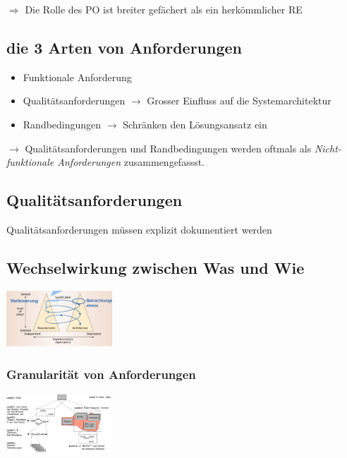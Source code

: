 \documentclass{report}
\newenvironment{Figure}
	{\par\medskip\noindent\minipage{\linewidth}}
	{\endminipage\par\medskip}
\theoremstyle{definition}
\theoremstyle{example}
\begin{document}
$\Rightarrow$ Die Rolle des PO ist breiter gefächert als ein herkömmlicher RE

\subsection{die 3 Arten von Anforderungen}
\begin{itemize}
   \item Funktionale Anforderung
   \item Qualitätsanforderungen $\rightarrow$ Grosser Einfluss auf die Systemarchitektur
   \item Randbedingungen $\rightarrow$ Schränken den Lösungsansatz ein
\end{itemize}
$\rightarrow$ Qualitätsanforderungen und Randbedingungen werden oftmals als \textit{Nicht-funktionale Anforderungen} zusammengefassst.

   \subsection{Qualitätsanforderungen}
Qualitätsanforderungen müssen explizit dokumentiert werden

   \subsection{Wechselwirkung zwischen Was und Wie}
\begin{Figure}
   \centering
    \includegraphics[width=150px]{img/WasWieModell.png}
        \label{fig:Wechselwirkung zwischen Was und Wie}
\end{Figure}

   \subsubsection{Granularität von Anforderungen}

   \begin{Figure}
      \centering
       \includegraphics[width=150px]{img/GranularitaetAnforderungen.png}
           \label{fig:Granulariaet von Anforderungen}
   \end{Figure}
\end{document}
